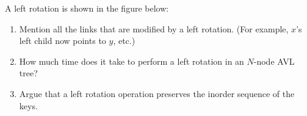  A left rotation is shown in the figure below:


\par
\begin{figure}[h]
\centerline{}\end{figure}

\par

\begin{enumerate}

\item  Mention all the links that are modified by a left rotation.
(For example, $x$'s left child now points to $y$, etc.)

\item  How much time does it take to perform a left rotation in an
$N$-node AVL tree?

\item  Argue that a left rotation operation preserves the inorder
sequence of the keys.

\end{enumerate}




